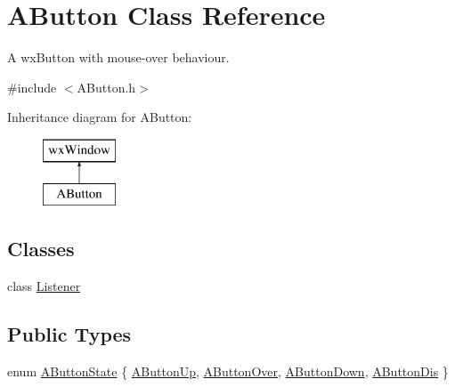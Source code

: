 \hypertarget{class_a_button}{}\section{A\+Button Class Reference}
\label{class_a_button}


A wx\+Button with mouse-\/over behaviour.  




{\ttfamily \#include $<$A\+Button.\+h$>$}

Inheritance diagram for A\+Button\+:\begin{figure}[H]
\begin{center}
\leavevmode
\includegraphics[height=2.000000cm]{class_a_button}
\end{center}
\end{figure}
\subsection*{Classes}
\begin{DoxyCompactItemize}
\item 
class \hyperlink{class_a_button_1_1_listener}{Listener}
\end{DoxyCompactItemize}
\subsection*{Public Types}
\begin{DoxyCompactItemize}
\item 
enum \hyperlink{class_a_button_a2a19d9c33e99070a58b412676c6e3a83}{A\+Button\+State} \{ \hyperlink{class_a_button_a2a19d9c33e99070a58b412676c6e3a83a7b3595d8ffd640d466a9ff667943a120}{A\+Button\+Up}, 
\hyperlink{class_a_button_a2a19d9c33e99070a58b412676c6e3a83aa43a56eb8e2444a69ccf058b20cfc17e}{A\+Button\+Over}, 
\hyperlink{class_a_button_a2a19d9c33e99070a58b412676c6e3a83abe7563fde2e83682284098a513eeecc0}{A\+Button\+Down}, 
\hyperlink{class_a_button_a2a19d9c33e99070a58b412676c6e3a83a85c36e5ba22412bb87f3812a7738ce9f}{A\+Button\+Dis}
 \}
\end{DoxyCompactItemize}
